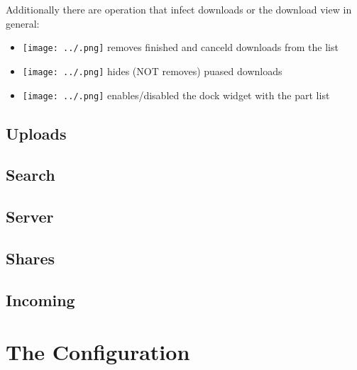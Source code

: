 \documentclass[a4paper,10pt]{book}
\begin{document}
Additionally there are operation that infect downloads or the download view in general:
\begin{itemize}
 \item \texttt{[image: ../.png]} removes finished and canceld downloads from the list
 \item \texttt{[image: ../.png]} hides (NOT removes) puased downloads
 \item \texttt{[image: ../.png]} enables/disabled the dock widget with the part list
\end{itemize}

\subsection{Uploads}
\label{sec:uploads}

\subsection{Search}
\label{sec:search}

\subsection{Server}
\label{sec:server}

\subsection{Shares}
\label{sec:shares}

\subsection{Incoming}
\label{sec:incoming}

\section{The Configuration}
\end{document}
